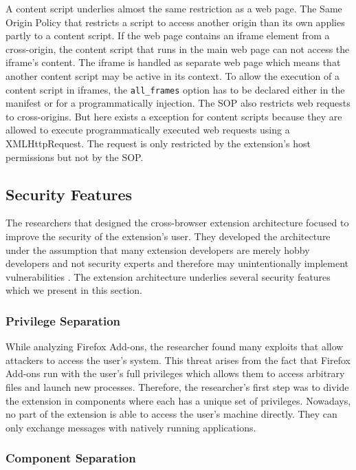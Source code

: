 	A content script underlies almost the same restriction as a web page. The Same Origin Policy that restricts a script to access another origin than its own applies partly to a content script. If the web page contains an iframe element from a cross-origin, the content script that runs in the main web page can not access the iframe's content. The iframe is handled as separate web page which means that another content script may be active in its context. To allow the execution of a content script in iframes, the \texttt{all\_frames} option has to be declared either in the manifest or for a programmatically injection. The SOP also restricts web requests to cross-origins. But here exists a exception for content scripts because they are allowed to execute programmatically executed web requests using a XMLHttpRequest. The request is only restricted by the extension's host permissions but not by the SOP. 

\subsection{Security Features}

	The researchers that designed the cross-browser extension architecture focused to improve the security of the extension's user. They developed the architecture under the assumption that many extension developers are merely hobby developers and not security experts and therefore may unintentionally implement vulnerabilities \cite{Barth10protectingbrowsers}. The extension architecture underlies several security features which we present in this section.
	
\subsubsection{Privilege Separation}

	While analyzing Firefox Add-ons, the researcher found many exploits that allow attackers to access the user's system. This threat arises from the fact that Firefox Add-ons run with the user's full privileges which allows them to access arbitrary files and launch new processes. Therefore, the researcher's first step was to divide the extension in components where each has a unique set of privileges. Nowadays, no part of the extension is able to access the user's machine directly. They can only exchange messages with natively running applications. 
		
\subsubsection{Component Separation}

